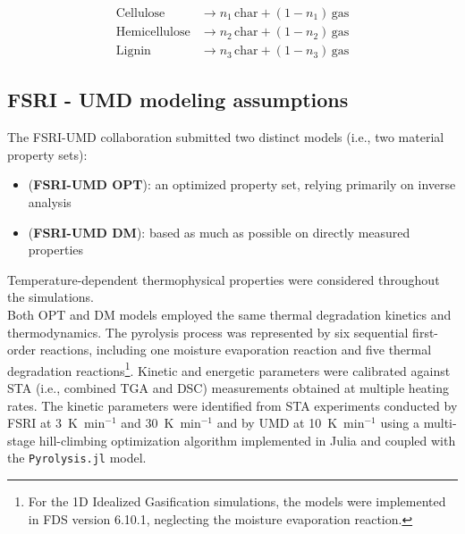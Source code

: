 \documentclass{article}
\begin{document}
\begin{equation}
\label{eq:CORIA-pyrolysis-reactions}
\begin{aligned}
\mathrm{Cellulose}      &\rightarrow n_1\,\mathrm{char} + (1-n_1)\,\mathrm{gas} \\
\mathrm{Hemicellulose}  &\rightarrow n_2\,\mathrm{char} + (1-n_2)\,\mathrm{gas} \\
\mathrm{Lignin}         &\rightarrow n_3\,\mathrm{char} + (1-n_3)\,\mathrm{gas}
\end{aligned}
\end{equation}



\subsection{FSRI - UMD modeling assumptions}
The FSRI-UMD collaboration submitted two distinct models (i.e., two material property sets):
\begin{itemize}
	\item (\textbf{FSRI-UMD OPT}): an optimized property set, relying primarily on inverse analysis
	\item (\textbf{FSRI-UMD DM}): based as much as possible on directly measured properties	
\end{itemize}
Temperature-dependent thermophysical properties were considered throughout the simulations. \\

Both OPT and DM models employed the same thermal degradation kinetics and thermodynamics. The pyrolysis process was represented by six sequential first-order reactions, including one moisture evaporation reaction and five thermal degradation reactions\footnote{For the 1D Idealized Gasification simulations, the models were implemented in FDS version 6.10.1, neglecting the moisture evaporation reaction.}. Kinetic and energetic parameters were calibrated against STA (i.e., combined TGA and DSC) measurements obtained at multiple heating rates. The kinetic parameters were identified from STA experiments conducted by FSRI at 3~K~min$^{-1}$ and 30~K~min$^{-1}$ and by UMD at 10~K~min$^{-1}$ using a multi-stage hill-climbing optimization algorithm implemented in Julia and coupled with the \texttt{Pyrolysis.jl} model. 
\end{document}

